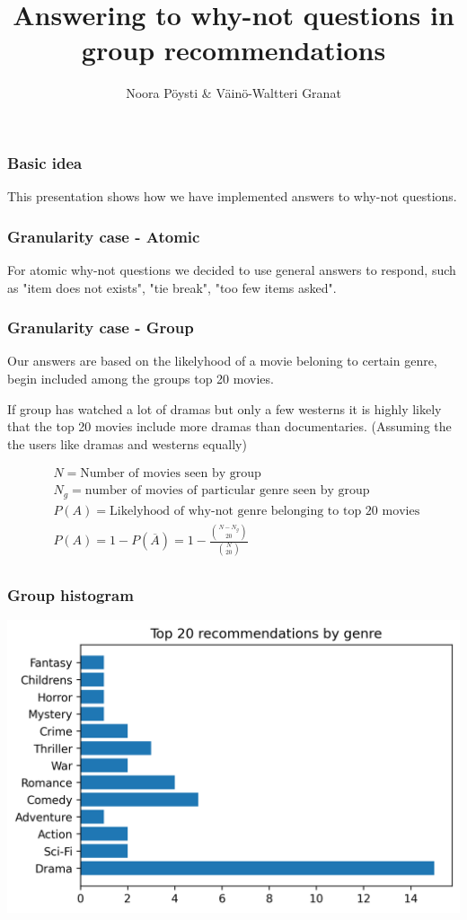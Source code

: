 \documentclass{beamer}
\title{Answering to why-not questions in group recommendations}
\author{Noora Pöysti \& Väinö-Waltteri Granat}
\begin{document}
\frame{\titlepage}


\begin{frame}
    \frametitle{Basic idea}
    This presentation shows how we have implemented answers to why-not questions.
\end{frame}

\begin{frame}
    \frametitle{Granularity case - Atomic}
    For atomic why-not questions we decided to use general answers to respond, such as "item does not exists", "tie break", "too few items asked". 

\end{frame}

\begin{frame}
  \frametitle{Granularity case - Group}

  Our answers are based on the likelyhood of a movie beloning to certain genre, begin included among the groups top 20 movies.
  
  If group has watched a lot of dramas but only a few westerns it is highly likely that the top 20 movies include
   more dramas than documentaries. (Assuming the the users like dramas and westerns equally)

  \begin{align*}
    & N = \text{Number of movies seen by group} \\
    & N_g = \text{number of movies of particular genre seen by group} \\
    & P(A) = \text{Likelyhood of why-not genre belonging to top 20 movies }\\
  & P(A) = 1-P(\overline{A}) = 1 - \frac{{N-N_g \choose 20}}{{N \choose 20}} \\
  \end{align*} 
\end{frame}

\begin{frame}
  \frametitle{Group histogram}
  \includegraphics[width=\textwidth]{genre_top20.png}
\end{frame}
\end{document}
